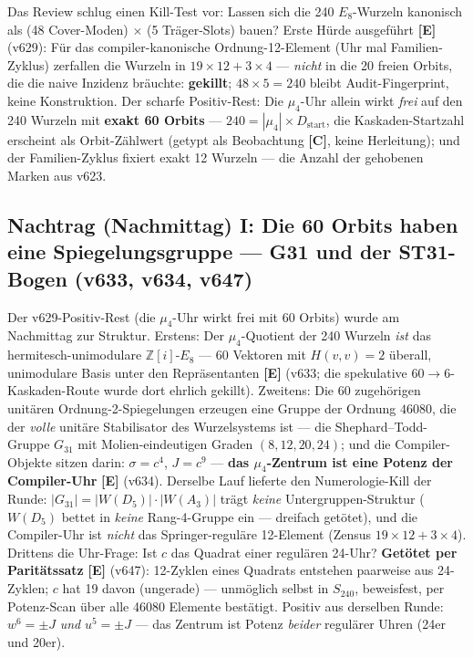 \documentclass[11pt,a4paper]{article}
\newcommand{\E}{\textcolor{gut}{\textbf{[E]}}}
\newcommand{\C}{\textcolor{kern}{\textbf{[C]}}}
\begin{document}
Das Review schlug einen Kill-Test vor: Lassen sich die 240
$E_8$-Wurzeln kanonisch als (48 Cover-Moden) $\times$ (5
Träger-Slots) bauen? Erste Hürde ausgeführt \E{} (v629): Für das
compiler-kanonische Ordnung-12-Element (Uhr mal Familien-Zyklus)
zerfallen die Wurzeln in $19 \times 12 + 3 \times 4$ --- \emph{nicht}
in die 20 freien Orbits, die die naive Inzidenz bräuchte:
\textbf{gekillt}; $48 \times 5 = 240$ bleibt Audit-Fingerprint, keine
Konstruktion. Der scharfe Positiv-Rest: Die $\mu_4$-Uhr allein wirkt
\emph{frei} auf den 240 Wurzeln mit \textbf{exakt 60 Orbits} ---
$240 = |\mu_4| \times D_{\mathrm{start}}$, die Kaskaden-Startzahl
erscheint als Orbit-Zählwert (getypt als Beobachtung \C{}, keine
Herleitung); und der Familien-Zyklus fixiert exakt 12 Wurzeln --- die
Anzahl der gehobenen Marken aus v623.

\subsection*{Nachtrag (Nachmittag) I: Die 60 Orbits haben eine
Spiegelungsgruppe --- G31 und der ST31-Bogen (v633, v634, v647)}

Der v629-Positiv-Rest (die $\mu_4$-Uhr wirkt frei mit 60 Orbits)
wurde am Nachmittag zur Struktur. Erstens: Der $\mu_4$-Quotient der
240 Wurzeln \emph{ist} das hermitesch-unimodulare
$\mathbb{Z}[i]$-$E_8$ --- 60 Vektoren mit $H(v,v) = 2$ überall,
unimodulare Basis unter den Repräsentanten \E{} (v633; die
spekulative $60 \to 6$-Kaskaden-Route wurde dort ehrlich gekillt).
Zweitens: Die 60 zugehörigen unitären Ordnung-2-Spiegelungen
erzeugen eine Gruppe der Ordnung $46080$, die der \emph{volle}
unitäre Stabilisator des Wurzelsystems ist --- die
Shephard--Todd-Gruppe $G_{31}$ mit Molien-eindeutigen Graden
$(8, 12, 20, 24)$; und die Compiler-Objekte sitzen darin:
$\sigma = c^4$, $J = c^9$ --- \textbf{das $\mu_4$-Zentrum ist eine
Potenz der Compiler-Uhr} \E{} (v634). Derselbe Lauf lieferte den
Numerologie-Kill der Runde: $|G_{31}| = |W(D_5)| \cdot |W(A_3)|$
trägt \emph{keine} Untergruppen-Struktur ($W(D_5)$ bettet in
\emph{keine} Rang-4-Gruppe ein --- dreifach getötet), und die
Compiler-Uhr ist \emph{nicht} das Springer-reguläre 12-Element
(Zensus $19 \times 12 + 3 \times 4$). Drittens die Uhr-Frage:
Ist $c$ das Quadrat einer regulären 24-Uhr? \textbf{Getötet per
Paritätssatz} \E{} (v647): 12-Zyklen eines Quadrats entstehen
paarweise aus 24-Zyklen; $c$ hat 19 davon (ungerade) --- unmöglich
selbst in $S_{240}$, beweisfest, per Potenz-Scan über alle 46080
Elemente bestätigt. Positiv aus derselben Runde: $w^6 = \pm J$
\emph{und} $u^5 = \pm J$ --- das Zentrum ist Potenz \emph{beider}
regulärer Uhren (24er und 20er).
\end{document}

